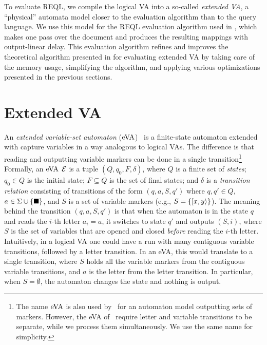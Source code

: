 
To evaluate REQL, we compile the logical VA into a so-called \emph{extended VA},
a ``physical'' automata model closer to the evaluation algorithm than to the
query language. We use this model for the REQL evaluation algorithm used in
\rematch, which makes one pass over the document and produces the resulting
mappings with output-linear delay. This evaluation algorithm refines and
improves the theoretical algorithm presented in \citet{FlorenzanoRUVV20} for
evaluating extended VA by taking care of the memory usage, simplifying the
algorithm, and applying various optimizations presented in the previous
sections.

\section{Extended VA}

An \emph{extended variable-set automaton} (\(\mathrm{eVA}\))~\citep{FaginKRV15} is a
finite-state automaton extended with capture variables in a way analogous to
logical VAs. The difference is that reading and outputting variable markers can
be done in a single transition\footnote{The name $\mathrm{eVA}$ is also used
by~\citet{FlorenzanoRUVV20} for an automaton model outputting sets of markers.
However, the eVA of~\citet{FlorenzanoRUVV20} require letter and variable
transitions to be separate, while we process them simultaneously. We use the
same name for simplicity.}
Formally, an $\mathrm{eVA}$ $\mathcal{E}$ is a tuple \((Q, q_0, F, \delta)\), where \(Q\) is a
finite set of \textit{states}; $q_0 \in Q$ is the initial state; $F\subseteq Q$
is the set of final states; and $\delta$ is a \textit{transition relation}
consisting of transitions of the form $(q, a, S, q')$ where $q, q' \in Q$, $a
\in \Sigma \cup \{\blacksquare\}$, and $S$ is a set of variable markers (e.g.,
$S=\{[ x,y \rangle\}$). The meaning behind the transition $(q, a, S, q')$
is that when the automaton is in the state $q$ and reads the $i$-th letter $a_i
= a$, it switches to state $q'$ and outputs $(S, i)$, where $S$ is the set of
variables that are opened and closed \emph{before} reading the $i$-th letter.
Intuitively, in a logical VA one could have a run with many contiguous variable
transitions, followed by a letter transition. In an eVA, this would translate to
a single transition, where $S$ holds all the variable markers from the
contiguous variable transitions, and $a$ is the letter from the letter
transition. In particular, when $S = \emptyset$, the automaton changes the state
and nothing is output.


